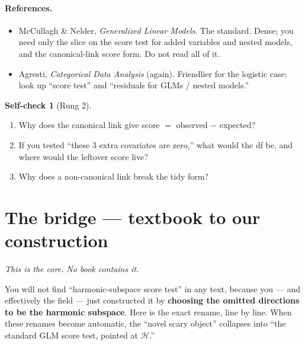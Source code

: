 \documentclass[11pt,a4paper]{article}
\newcommand{\Hh}{\mathcal{H}}
\theoremstyle{definition}
\newtheorem*{selfcheck}{Self-check}
\begin{document}
\paragraph{References.}
\begin{itemize}[leftmargin=1.4em,itemsep=0.3em]
\item McCullagh \& Nelder, \emph{Generalized Linear Models}. The standard. Dense;
  you need only the slice on the score test for added variables and nested
  models, and the canonical-link score form. Do not read all of it.
\item Agresti, \emph{Categorical Data Analysis} (again). Friendlier for the
  logistic case; look up ``score test'' and ``residuals for GLMs / nested
  models.''
\end{itemize}

\begin{selfcheck}[Rung 2]
\begin{enumerate}[leftmargin=1.6em,itemsep=0.2em,topsep=0.3em]
\item Why does the canonical link give score $=$ observed $-$ expected?
\item If you tested ``these 3 extra covariates are zero,'' what would the df be,
  and where would the leftover score live?
\item Why does a non-canonical link break the tidy form?
\end{enumerate}
\end{selfcheck}

\section{The bridge --- textbook to our construction}
\label{sec:bridge}

\emph{This is the core. No book contains it.}

\medskip
You will not find ``harmonic-subspace score test'' in any text, because you --- and
effectively the field --- just constructed it by \textbf{choosing the omitted
directions to be the harmonic subspace}. Here is the exact rename, line by line.
When these renames become automatic, the ``novel scary object'' collapses into
``the standard GLM score test, pointed at $\Hh$.''
\end{document}
